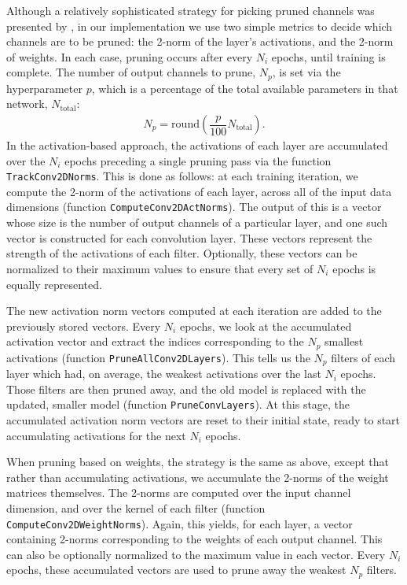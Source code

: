 \documentclass{article}
\begin{document}
Although a relatively sophisticated strategy for picking pruned channels was presented by \cite{prune_transfer_learning}, in our implementation we use two simple metrics to decide which channels are to be pruned: the 2-norm of the layer's activations, and the 2-norm of weights. In each case, pruning occurs after every $N_i$ epochs, until training is complete. The number of output channels to prune, $N_p$, is set via the hyperparameter $p$, which is a percentage of the total available parameters in that network, $N_\mathrm{total}$:
\begin{align}
	N_p = \mathrm{round} \left(\dfrac{p}{100}N_\mathrm{total}\right).
\end{align}
In the activation-based approach, the activations of each layer are accumulated over the $N_i$ epochs preceding a single pruning pass via the function \texttt{TrackConv2DNorms}. This is done as follows: at each training iteration, we compute the 2-norm of the activations of each layer, across all of the input data dimensions (function \texttt{ComputeConv2DActNorms}). The output of this is a vector whose size is the number of output channels of a particular layer, and one such vector is constructed for each convolution layer. These vectors represent the strength of the activations of each filter. Optionally, these vectors can be normalized to their maximum values to ensure that every set of $N_i$ epochs is equally represented.

The new activation norm vectors computed at each iteration are added to the previously stored vectors. Every $N_i$ epochs, we look at the accumulated activation vector and extract the indices corresponding to the $N_p$ smallest activations (function \texttt{PruneAllConv2DLayers}). This tells us the $N_p$ filters of each layer which had, on average, the weakest activations over the last $N_i$ epochs. Those filters are then pruned away, and the old model is replaced with the updated, smaller model (function \texttt{PruneConvLayers}). At this stage, the accumulated activation norm vectors are reset to their initial state, ready to start accumulating activations for the next $N_i$ epochs.

When pruning based on weights, the strategy is the same as above, except that rather than accumulating activations, we accumulate the 2-norms of the weight matrices themselves. The 2-norms are computed over the input channel dimension, and over the kernel of each filter (function \texttt{ComputeConv2DWeightNorms}). Again, this yields, for each layer, a vector containing 2-norms corresponding to the weights of each output channel. This can also be optionally normalized to the maximum value in each vector. Every $N_i$ epochs, these accumulated vectors are used to prune away the weakest $N_p$ filters.
\end{document}
